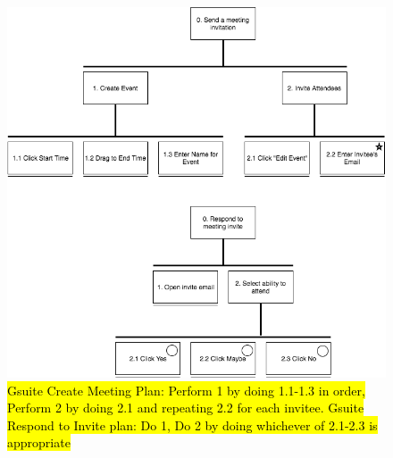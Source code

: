 \documentclass{sigchi}
\begin{document}
\begin{figure}

  \centering

  \includegraphics[width=1.75\columnwidth]{google/GoogleHTA}

  \caption{\hl{Gsuite Create Meeting Plan: Perform 1 by doing 1.1-1.3 in order, Perform 2 by doing 2.1 and repeating 2.2 for each invitee. Gsuite Respond to Invite plan: Do 1, Do 2 by doing whichever of 2.1-2.3 is appropriate}}
    \label{GoogleHTA}

\end{figure}
\end{document}
